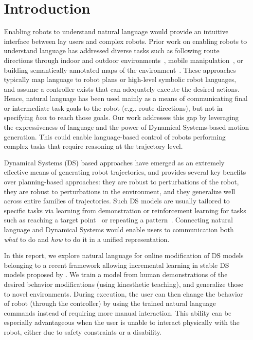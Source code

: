 \section{Introduction}
\label{secIntroduction}

Enabling robots to understand natural language would provide an intuitive interface between lay users and complex robots.
Prior work on enabling robots to understand language has addressed diverse tasks such as following route directions through indoor and outdoor environments~\cite{macmahon06, kollar10, matuszek12a, duvallet13, boularias15}, mobile manipulation~\cite{tellex11, howard14a}, or building semantically-annotated maps of the environment~\cite{walter13}.
These approaches typically map language to robot plans or high-level symbolic robot languages, and assume a controller exists that can adequately execute the desired actions.
Hence, natural language has been used mainly as a means of communicating final or intermediate task goals to the robot (e.g., route directions), but not in specifying \emph{how} to reach those goals.
Our work addresses this gap by leveraging the expressiveness of language and the power of Dynamical Systems-based motion generation.
This could enable language-based control of robots performing complex tasks that require reasoning at the trajectory level.

Dynamical Systems (DS) based approaches have emerged as an extremely effective means of generating robot trajectories, and provides several key benefits over planning-based approaches:
they are robust to perturbations of the robot,
they are robust to perturbations in the environment,
and they generalize well across entire families of trajectories.
Such DS models are usually tailored to specific tasks via learning from demonstration or reinforcement learning for tasks such as reaching a target point~\cite{KhansariZadeh2011,Calinon2012} or repeating a pattern~\cite{Buchli2006}.
Connecting natural language and Dynamical Systems would enable users to communication both \emph{what} to do and \emph{how} to do it in a unified representation.

In this report, we explore natural language for online modification of DS models belonging to a recent framework allowing incremental learning in stable DS models proposed by \citet{Kronander2015}.
We train a model from human demonstrations of the desired behavior modifications (using kinesthetic teaching), and generalize those to novel environments.
During execution, the user can then change the behavior of robot (through the controller) by using the trained natural language commands instead of requiring more manual interaction.
This ability can be especially advantageous when the user is unable to interact physically with the robot, either due to safety constraints or a disability.

